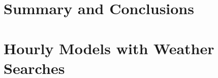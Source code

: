 \documentclass{article}
\begin{document}
\section{Summary and Conclusions}


\appendix

\section{Hourly Models with Weather Searches}

\clearpage



% 
% 
\end{document}
